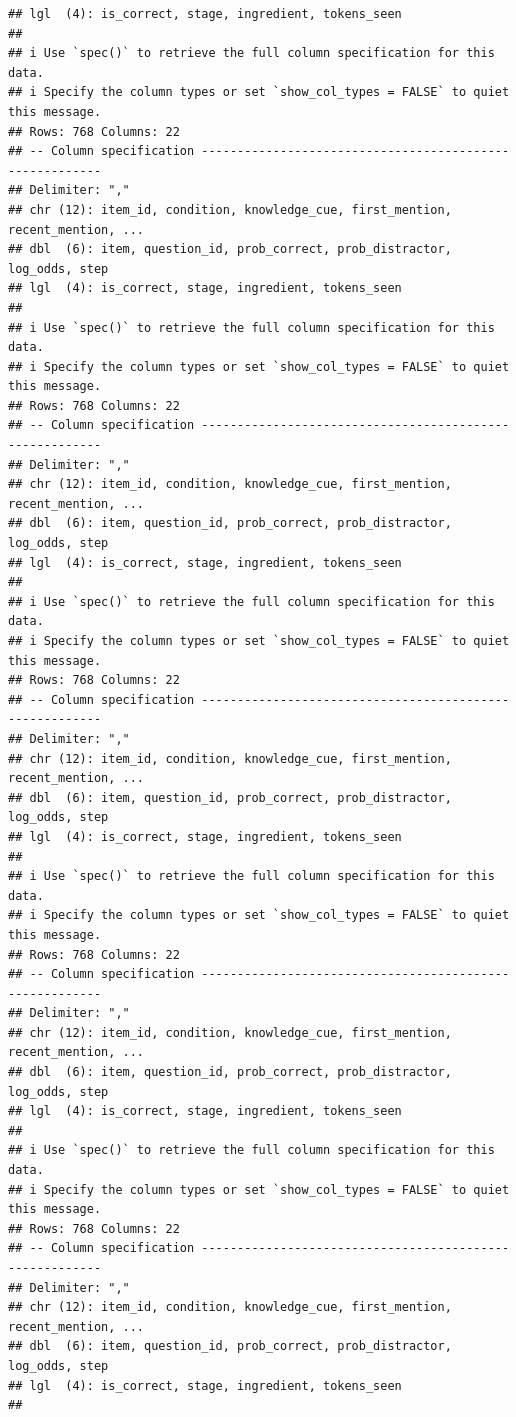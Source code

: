 \documentclass[
]{article}
\begin{document}
\begin{verbatim}
## lgl  (4): is_correct, stage, ingredient, tokens_seen
## 
## i Use `spec()` to retrieve the full column specification for this data.
## i Specify the column types or set `show_col_types = FALSE` to quiet this message.
## Rows: 768 Columns: 22
## -- Column specification --------------------------------------------------------
## Delimiter: ","
## chr (12): item_id, condition, knowledge_cue, first_mention, recent_mention, ...
## dbl  (6): item, question_id, prob_correct, prob_distractor, log_odds, step
## lgl  (4): is_correct, stage, ingredient, tokens_seen
## 
## i Use `spec()` to retrieve the full column specification for this data.
## i Specify the column types or set `show_col_types = FALSE` to quiet this message.
## Rows: 768 Columns: 22
## -- Column specification --------------------------------------------------------
## Delimiter: ","
## chr (12): item_id, condition, knowledge_cue, first_mention, recent_mention, ...
## dbl  (6): item, question_id, prob_correct, prob_distractor, log_odds, step
## lgl  (4): is_correct, stage, ingredient, tokens_seen
## 
## i Use `spec()` to retrieve the full column specification for this data.
## i Specify the column types or set `show_col_types = FALSE` to quiet this message.
## Rows: 768 Columns: 22
## -- Column specification --------------------------------------------------------
## Delimiter: ","
## chr (12): item_id, condition, knowledge_cue, first_mention, recent_mention, ...
## dbl  (6): item, question_id, prob_correct, prob_distractor, log_odds, step
## lgl  (4): is_correct, stage, ingredient, tokens_seen
## 
## i Use `spec()` to retrieve the full column specification for this data.
## i Specify the column types or set `show_col_types = FALSE` to quiet this message.
## Rows: 768 Columns: 22
## -- Column specification --------------------------------------------------------
## Delimiter: ","
## chr (12): item_id, condition, knowledge_cue, first_mention, recent_mention, ...
## dbl  (6): item, question_id, prob_correct, prob_distractor, log_odds, step
## lgl  (4): is_correct, stage, ingredient, tokens_seen
## 
## i Use `spec()` to retrieve the full column specification for this data.
## i Specify the column types or set `show_col_types = FALSE` to quiet this message.
## Rows: 768 Columns: 22
## -- Column specification --------------------------------------------------------
## Delimiter: ","
## chr (12): item_id, condition, knowledge_cue, first_mention, recent_mention, ...
## dbl  (6): item, question_id, prob_correct, prob_distractor, log_odds, step
## lgl  (4): is_correct, stage, ingredient, tokens_seen
## 

\end{verbatim}
\end{document}
